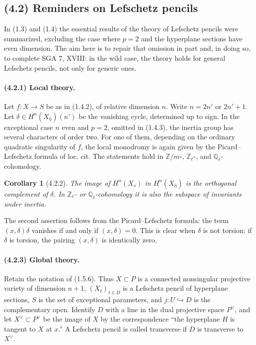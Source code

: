 \documentclass[11pt]{article}
\newtheorem{corollary}{Corollary}
\theoremstyle{remark}
\begin{document}
\subsection*{(4.2) Reminders on Lefschetz pencils}

In (1.3) and (1.4) the essential results of the theory of Lefschetz pencils were summarized, excluding the case where $p=2$ and the hyperplane sections have even dimension. The aim here is to repair that omission in part and, in doing so, to complete SGA 7, XVIII: in the wild case, the theory holds for general Lefschetz pencils, not only for generic ones.

\paragraph{(4.2.1) Local theory.}
Let $f:X\to S$ be as in (1.4.2), of relative dimension $n$. Write $n=2n'$ or $2n'+1$. Let $\delta\in H^n(X_{\bar\eta})(n')$ be the vanishing cycle, determined up to sign. In the exceptional case $n$ even and $p=2$, omitted in (1.4.3), the inertia group has several characters of order two. For one of them, depending on the ordinary quadratic singularity of $f$, the local monodromy is again given by the Picard--Lefschetz formula of loc. cit. The statements hold in $\mathbb Z/m$-, $\mathbb Z_\ell$-, and $\mathbb Q_\ell$-cohomology.

\begin{corollary}[4.2.2]
The image of $H^n(X_s)$ in $H^n(X_{\bar\eta})$ is the orthogonal complement of $\delta$. In $\mathbb Z_\ell$- or $\mathbb Q_\ell$-cohomology it is also the subspace of invariants under inertia.
\end{corollary}

The second assertion follows from the Picard--Lefschetz formula: the term $(x,\delta)\delta$ vanishes if and only if $(x,\delta)=0$. This is clear when $\delta$ is not torsion; if $\delta$ is torsion, the pairing $(x,\delta)$ is identically zero.

\paragraph{(4.2.3) Global theory.}
Retain the notation of (1.5.6). Thus $X\subset P$ is a connected nonsingular projective variety of dimension $n+1$, $(X_t)_{t\in D}$ is a Lefschetz pencil of hyperplane sections, $S$ is the set of exceptional parameters, and $j:U\hookrightarrow D$ is the complementary open. Identify $D$ with a line in the dual projective space $P^\vee$, and let $X^\vee\subset P^\vee$ be the image of $X$ by the correspondence ``the hyperplane $H$ is tangent to $X$ at $x$.'' A Lefschetz pencil is called transverse if $D$ is transverse to $X^\vee$.
\end{document}
